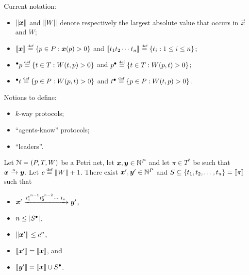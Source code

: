 Current notation:
\begin{itemize}
  \item $\lVert\bm{x}\rVert$ and $\lVert W\rVert$ denote respectively the
    largest absolute value that occurs in $\vec{x}$ and $W$;

  \item $\llbracket\bm{x}\rrbracket \stackrel{\scriptscriptstyle\text{def}}{=} \{p \in P : \bm{x}(p) > 0\}$ and
    $\llbracket t_1 t_2 \cdots t_n\rrbracket \stackrel{\scriptscriptstyle\text{def}}{=} \{t_i : 1 \leq i \leq n\}$;

  \item ${^\bullet p} \stackrel{\scriptscriptstyle\text{def}}{=} \{t \in T : W(t, p) > 0\}$ and ${p^\bullet}
    \stackrel{\scriptscriptstyle\text{def}}{=} \{t \in T : W(p, t) > 0\}$;

  \item ${^\bullet t} \stackrel{\scriptscriptstyle\text{def}}{=} \{p \in P : W(p, t) > 0\}$ and ${t^\bullet}
    \stackrel{\scriptscriptstyle\text{def}}{=} \{p \in P : W(t, p) > 0\}$.
\end{itemize}
Notions to define:
\begin{itemize}
\item $k$-way protocols;
\item ``agents-know'' protocols;
\item ``leaders''.
\end{itemize}

\begin{proposition}\label{prop:short:saturation}
  Let $\mathcal{N} = (P, T, W)$ be a Petri net, let $\bm{x}, \bm{y} \in
  \mathbb{N}^P$ and let $\pi \in T^*$ be such that $\bm{x} \xrightarrow{\pi}
  \bm{y}$. Let $c \stackrel{\scriptscriptstyle\text{def}}{=} \lVert W\rVert + 1$. There exist $\bm{x}',
  \bm{y}' \in \mathbb{N}^P$ and $S \subseteq \{t_1, t_2, \ldots, t_n\} =
  \llbracket\pi\rrbracket$ such that
  \begin{itemize}
  \item $\bm{x}' \xrightarrow{t_1^{c^{n-1}} t_2^{c^{n-2}} \cdots\ t_n}
    \bm{y}'$,

  \item $n \leq |{S^\bullet}|$,

  \item $\lVert\bm{x}'\rVert \leq c^n$,

  \item $\llbracket\bm{x}'\rrbracket = \llbracket\bm{x}\rrbracket$, and 

  \item $\llbracket\bm{y}'\rrbracket = \llbracket\bm{x}\rrbracket \cup {S^\bullet}$.
  \end{itemize}
\end{proposition}

